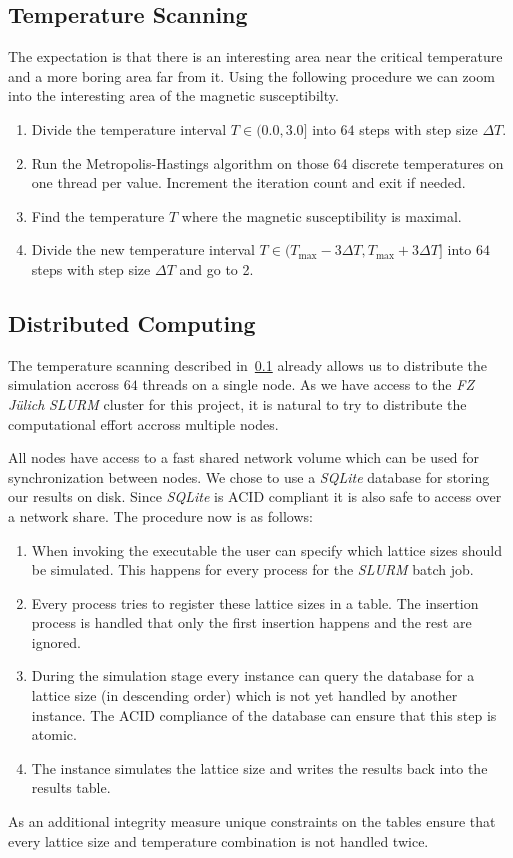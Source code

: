 \subsection{Temperature Scanning}\label{sec:temperature_scanning}
The expectation is that there is an interesting area near the critical temperature and a more boring area far from it. Using the following procedure we can zoom into the interesting area of the magnetic susceptibilty.
\begin{enumerate}
	\item Divide the temperature interval $T \in (0.0, 3.0]$ into $64$ steps with step size $\Delta T$.
	\item Run the Metropolis-Hastings algorithm on those $64$ discrete temperatures on one thread per value. Increment the iteration count and exit if needed.
	\item Find the temperature $T$ where the magnetic susceptibility is maximal.
	\item Divide the new temperature interval $T \in (T_\text{max} - 3\Delta T, T_\text{max} + 3\Delta T]$ into $64$ steps with step size $\Delta T$ and go to 2.
\end{enumerate}


\subsection{Distributed Computing}\label{sec:distributed_computing}
The temperature scanning described in~\cref{sec:temperature_scanning} already allows us to distribute the simulation accross $64$ threads on a single node. As we have access to the \emph{FZ Jülich} \emph{SLURM} cluster for this project, it is natural to try to distribute the computational effort accross multiple nodes.

All nodes have access to a fast shared network volume which can be used for synchronization between nodes. We chose to use a \emph{SQLite} database for storing our results on disk. Since \emph{SQLite} is ACID compliant it is also safe to access over a network share. The procedure now is as follows:
\begin{enumerate}
	\item When invoking the executable the user can specify which lattice sizes should be simulated. This happens for every process for the \emph{SLURM} batch job.
	\item Every process tries to register these lattice sizes in a table. The insertion process is handled that only the first insertion happens and the rest are ignored.
	\item During the simulation stage every instance can query the database for a lattice size (in descending order) which is not yet handled by another instance. The ACID compliance of the database can ensure that this step is atomic.
	\item The instance simulates the lattice size and writes the results back into the results table.
\end{enumerate}
As an additional integrity measure unique constraints on the tables ensure that every lattice size and temperature combination is not handled twice.

